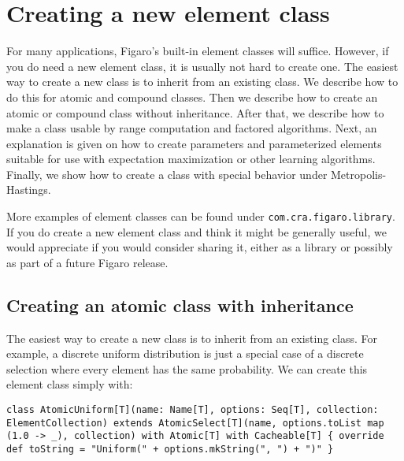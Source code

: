 
\chapter{Creating a new element class} %

\label{Creating a new element class} %

For many applications, Figaro's built-in element classes will suffice. However, if you do need a new element class, it is usually not hard to create one. The easiest way to create a new class is to inherit from an existing class. We describe how to do this for atomic and compound classes. Then we describe how to create an atomic or compound class without inheritance. After that, we describe how to make a class usable by range computation and factored algorithms. Next, an explanation is given on how to create parameters and parameterized elements suitable for use with expectation maximization or other learning algorithms. Finally, we show how to create a class with special behavior under Metropolis-Hastings.

More examples of element classes can be found under \texttt{com.cra.fig\-aro.library}. If you do create a new element class and think it might be generally useful, we would appreciate if you would consider sharing it, either as a library or possibly as part of a future Figaro release.

\section{Creating an atomic class with inheritance}

The easiest way to create a new class is to inherit from an existing class. For example, a discrete uniform distribution is just a special case of a discrete selection where every element has the same probability. We can create this element class simply with:

\begin{flushleft}
\texttt{class AtomicUniform[T](name: Name[T], options: Seq[T], collection: \newline ElementCollection) extends
\newline \tab AtomicSelect[T](name, options.toList map (1.0 -> \_), collection)
\newline \tab with Atomic[T] with Cacheable[T] \{
\newline \tab override def toString = "Uniform(" + options.mkString(", ") + ")"
\}
}
\end{flushleft}


